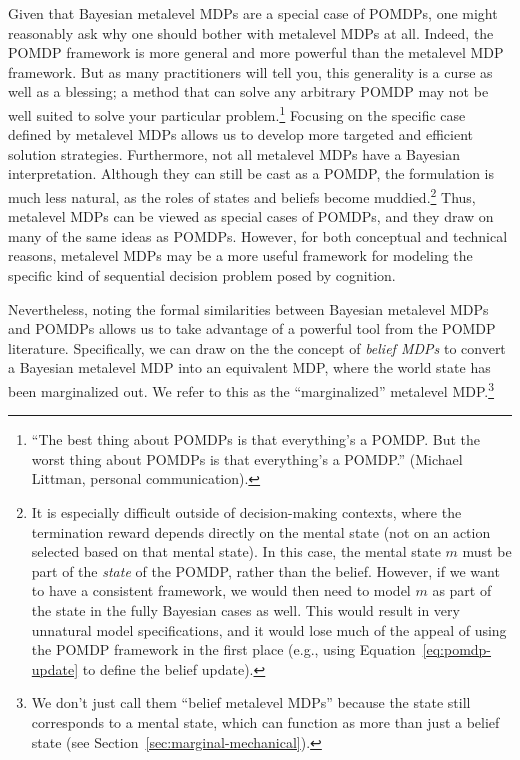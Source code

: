 Given that Bayesian metalevel MDPs are a special case of POMDPs, one might reasonably ask why one should bother with metalevel MDPs at all. Indeed, the POMDP framework is more general and more powerful than the metalevel MDP framework. But as many practitioners will tell you, this generality is a curse as well as a blessing; a method that can solve any arbitrary POMDP may not be well suited to solve your particular problem.\footnote{%
  ``The best thing about POMDPs is that everything's a POMDP. But the worst thing about POMDPs is that everything's a POMDP.'' (Michael Littman, personal communication).
} Focusing on the specific case defined by metalevel MDPs allows us to develop more targeted and efficient solution strategies. Furthermore, not all metalevel MDPs have a Bayesian interpretation. Although they can still be cast as a POMDP, the formulation is much less natural, as the roles of states and beliefs become muddied.\footnote{%
  It is especially difficult outside of decision-making contexts, where the termination reward depends directly on the mental state (not on an action selected based on that mental state). In this case, the mental state $m$ must be part of the \emph{state} of the POMDP, rather than the belief. However, if we want to have a consistent framework, we would then need to model $m$ as part of the state in the fully Bayesian cases as well. This would result in very unnatural model specifications, and it would lose much of the appeal of using the POMDP framework in the first place (e.g., using Equation~\ref{eq:pomdp-update} to define the belief update).
} Thus, metalevel MDPs can be viewed as special cases of POMDPs, and they draw on many of the same ideas as POMDPs. However, for both conceptual and technical reasons, metalevel MDPs may be a more useful framework for modeling the specific kind of sequential decision problem posed by cognition.

Nevertheless, noting the formal similarities between Bayesian metalevel MDPs and POMDPs allows us to take advantage of a powerful tool from the POMDP literature. Specifically, we can draw on the the concept of \emph{belief MDPs} \citep{kaelbling1998planningb} to convert a Bayesian metalevel MDP into an equivalent MDP, where the world state has been marginalized out. We refer to this as the ``marginalized'' metalevel MDP.\footnote{We don't just call them ``belief metalevel MDPs'' because the state still corresponds to a mental state, which can function as more than just a belief state (see Section~\ref{sec:marginal-mechanical}).}

